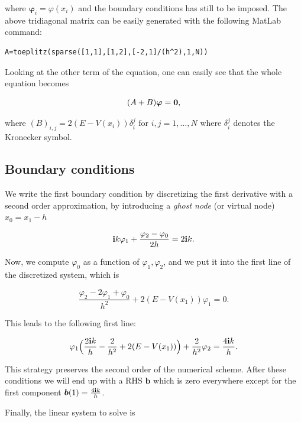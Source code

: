 \documentclass[12pt,a4paper,onecolumn]{article}
\theoremstyle{definition}
\theoremstyle{plain}
\newcommand{\var}{\varphi}
\begin{document}
where  $\boldsymbol{\var}_i=\var(x_i)$ 
and the boundary conditions has still to be imposed. The above tridiagonal matrix can be easily generated with the following MatLab command:
\begin{verbatim}
A=toeplitz(sparse([1,1],[1,2],[-2,1]/(h^2),1,N))
\end{verbatim}

Looking at the other term of the equation, one can easily see that the whole equation becomes

\[ (A+B) \boldsymbol{\var} = \bold{0},\]

where $(B)_{i,j}=2(E-V(x_i)) \delta_{i}^{j}\text{ for } i,j=1,\dots,N$ where $\delta_i^j$ denotes the Kronecker symbol.




\subsection{Boundary conditions}

We write the first boundary condition by discretizing the first derivative with a second order approximation, by introducing a \emph{ghost node} (or virtual node) $x_0=x_1-h$


\[ \bold{i} k \var_1+ \frac{\var_2-\var_0}{2h}=2 \bold{i} k. \]

Now, we compute $\var_0$ as a function of $\var_1, \var_2$, and we put it into the first line of the discretized system, which is 

\[ \frac{\var_2 - 2\var_1+\var_0}{h^2}+ 2(E-V(x_1))\var_1=0.\]


This leads to the following first line:  

\[ \var_1 \Big(\frac{2 \bold{i}k}{h}-\frac{2}{h^2}+2(E-V(x_1))\Big) + \frac{2}{h^2}\var_2=\frac{4 \bold{i}k}{h}.\]

This strategy preserves the second order of the numerical scheme.  After these conditions we will end up with a RHS $\boldsymbol{b}$ which is zero everywhere except for the first component $\boldsymbol{b}(1)=\frac{ 4 \bold{i} k}{h}$.

Finally, the linear system to solve is 
\end{document}
